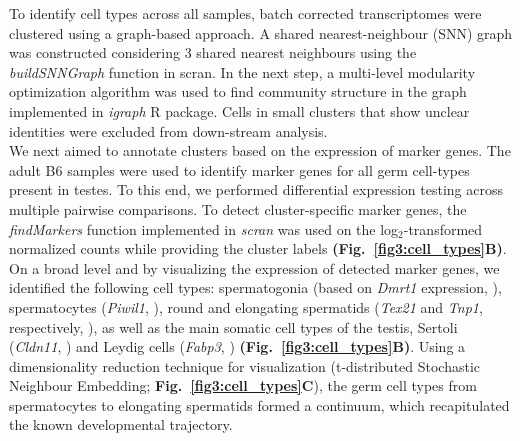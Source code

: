 To identify cell types across all samples, batch corrected transcriptomes were clustered using a graph-based approach. A shared nearest-neighbour (SNN) graph \citep{Xu2015} was constructed considering 3 shared nearest neighbours using the \emph{buildSNNGraph} function in scran. In the next step, a multi-level modularity optimization algorithm was used to find community structure in the graph \citep{Blondel2008} implemented in \emph{igraph} R package. Cells in small clusters that show unclear identities were excluded from down-stream analysis.\\
We next aimed to annotate clusters based on the expression of marker genes. The adult B6 samples were used to identify marker genes for all germ cell-types present in testes. To this end, we performed differential expression testing across multiple pairwise comparisons. To detect cluster-specific marker genes, the \emph{findMarkers} function implemented in \emph{scran} was used on the log$_2$-transformed normalized counts while providing the cluster labels \textbf{(Fig.~\ref{fig3:cell_types}B)}. \\

On a broad level and by visualizing the expression of detected marker genes, we identified the following cell types: spermatogonia (based on \textit{Dmrt1} expression, \citep{Matson2010}), spermatocytes (\textit{Piwil1}, \citep{Deng2002}), round and elongating spermatids (\textit{Tex21} and \textit{Tnp1}, respectively, \citep{Fujii2002}), as well as the main somatic cell types of the testis, Sertoli (\textit{Cldn11}, \citep{Mazaud-Guittot2010}) and Leydig cells (\textit{Fabp3}, \citep{Oresti2013}) \textbf{(Fig.~\ref{fig3:cell_types}B)}. Using a dimensionality reduction technique for visualization (t-distributed Stochastic Neighbour Embedding; \textbf{Fig.~\ref{fig3:cell_types}C}), the germ cell types from spermatocytes to elongating spermatids formed a continuum, which recapitulated the known developmental trajectory.

